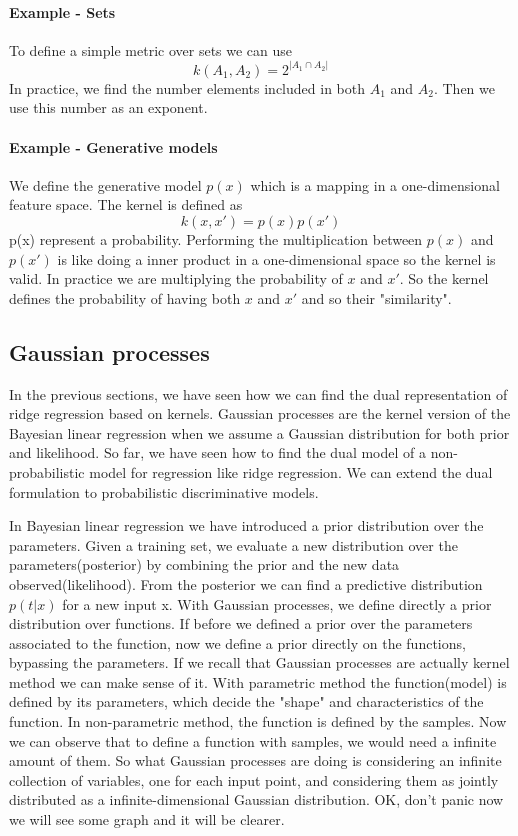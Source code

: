 \documentclass[../main.tex]{subfiles}
\begin{document}
\paragraph{Example - Sets} To define a simple metric over sets we can use
\begin{equation}
    k(A_1,A_2) = 2^{|A_1 \cap  A_2|}
\end{equation}
In practice, we find the number elements included in both $A_1$ and $A_2$. Then we use this number as an exponent.
\paragraph{Example - Generative models} We define the generative model $p(x)$ which is a mapping in a one-dimensional feature space. The kernel is defined as
\begin{equation}
    k(x,x') = p(x)p(x')
\end{equation}
p(x) represent a probability. Performing the multiplication between $p(x)$ and $p(x')$ is like doing a inner product in a one-dimensional space so the kernel is valid. In practice we are multiplying the probability of $x$ and $x'$. So the kernel defines the probability of having both $x$ and $x'$ and so their "similarity".

\subsection{Gaussian processes}
In the previous sections, we have seen how we can find the dual representation of ridge regression based on kernels. Gaussian processes are the kernel version of the Bayesian linear regression when we assume a Gaussian distribution for both prior and likelihood. So far, we have seen how to find the dual model of a non-probabilistic model for regression like ridge regression. We can extend the dual formulation to probabilistic discriminative models.

In Bayesian linear regression we have introduced a prior distribution over the parameters. Given a training set, we evaluate a new distribution over the parameters(posterior) by combining the prior and the new data observed(likelihood). From the posterior we can find a predictive distribution $p(t|x)$ for a new input x. With Gaussian processes, we define directly a prior distribution over functions\footnotemark. 
If before we defined a prior over the parameters associated to the function, now we define a prior directly on the functions, bypassing the parameters.
If we recall that Gaussian processes are actually kernel method we can make sense of it.
With parametric method the function(model) is defined by its parameters, which decide the "shape" and characteristics of the function.
In non-parametric method, the function is defined by the samples. Now we can observe that to define a function with samples, we would need a infinite amount of them. So what Gaussian processes are doing is considering an infinite collection of variables, one for each input point, and considering them as jointly distributed as a infinite-dimensional Gaussian distribution. OK, don't panic now we will see some graph and it will be clearer.
\end{document}
